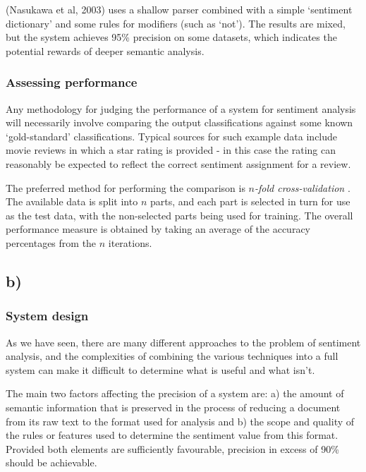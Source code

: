 \documentclass[11pt]{article}
\begin{document}
(Nasukawa et al, 2003)\cite{Nasukawa 2003} uses a shallow parser combined with
a simple `sentiment dictionary' and some rules for modifiers (such as `not').
The results are mixed, but the system achieves 95\% precision on some datasets,
which indicates the potential rewards of deeper semantic analysis.

\subsubsection*{Assessing performance}

Any methodology for judging the performance of a system for sentiment analysis
will necessarily involve comparing the output classifications against some
known `gold-standard' classifications. Typical sources for such example data
include movie reviews in which a star rating is provided - in this case the
rating can reasonably be expected to reflect the correct sentiment assignment
for a review.

The preferred method for performing the comparison is \emph{ $n$-fold
cross-validation }. The available data is split into $n$ parts, and each part
is selected in turn for use as the test data, with the non-selected parts being
used for training. The overall performance measure is obtained by taking an
average of the accuracy percentages from the $n$ iterations.

\subsection*{b)}

\subsubsection*{System design}

As we have seen, there are many different approaches to the problem of
sentiment analysis, and the complexities of combining the various techniques
into a full system can make it difficult to determine what is useful and what
isn't.

The main two factors affecting the precision of a system are: a) the amount of
semantic information that is preserved in the process of reducing a document
from its raw text to the format used for analysis and b) the scope and quality
of the rules or features used to determine the sentiment value from this
format.  Provided both elements are sufficiently favourable, precision in
excess of 90\% should be achievable.
\end{document}
